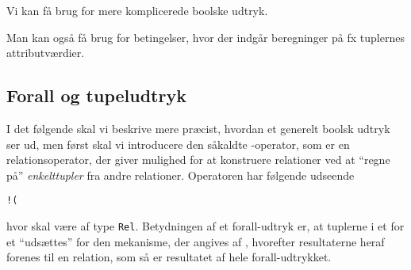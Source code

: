 Vi kan f\aa{} brug for mere komplicerede boolske udtryk.
\newpage
{}

Man kan ogs\aa{} f\aa{} brug for betingelser, hvor der indg\aa{}r 
beregninger p\aa{} fx tuplernes attributv\ae{}rdier.


\subsection{Forall og tupeludtryk}
I det f\o{}lgende skal vi beskrive mere pr\ae{}cist, hvordan et generelt
boolsk udtryk ser ud, men f\o{}rst skal vi introducere den
s\aa{}kaldte {\em {}}-operator, som er en relationsoperator, der
giver mulighed for at konstruere relationer ved at ``regne p\aa{}''
{\em enkelttupler\/} fra andre relationer. Operatoren har f\o{}lgende
udseende
\begin{center}
{\tt !(} 
\end{center}
hvor  skal v\ae{}re af type \verb"Rel". Betydningen af
et forall-udtryk er, at tuplerne i  et for et
``uds\ae{}ttes'' for den mekanisme, der angives af ,
hvorefter resultaterne heraf forenes til en relation, som s\aa{} er
resultatet af hele forall-udtrykket.

